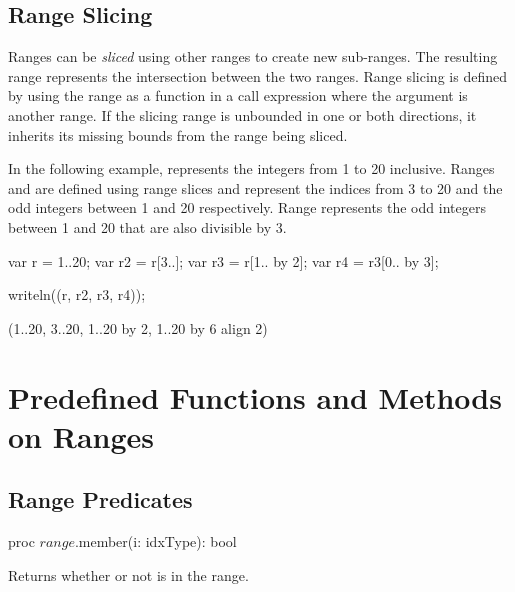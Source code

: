 \subsection{Range Slicing}
\label{Range_Slicing}

Ranges can be \emph{sliced} using other ranges to create new
sub-ranges.  The resulting range represents the intersection between
the two ranges.  Range slicing is defined by using the range as a
function in a call expression where the argument is another range.
If the slicing range is unbounded in one or both directions, it
inherits its missing bounds from the range being sliced.

\begin{example}
In the following example,  represents the integers from 1 to
20 inclusive.  Ranges  and  are defined using range
slices and represent the indices from 3 to 20 and the odd integers
between 1 and 20 respectively. Range  represents the odd
integers between 1 and 20 that are also divisible by 3.
\begin{chapelpre}
\end{chapelpre}
\begin{chapel}
var r = 1..20;
var r2 = r[3..];
var r3 = r[1.. by 2];
var r4 = r3[0.. by 3];
\end{chapel}
\begin{chapelpost}
writeln((r, r2, r3, r4));
\end{chapelpost}
\begin{chapeloutput}
(1..20, 3..20, 1..20 by 2, 1..20 by 6 align 2)
\end{chapeloutput}
\end{example}

\section{Predefined Functions and Methods on Ranges}

\subsection{Range Predicates}

\begin{protohead}
proc $range$.member(i: idxType): bool
\end{protohead}
\begin{protobody}
Returns whether or not  is in the range.
\end{protobody}

